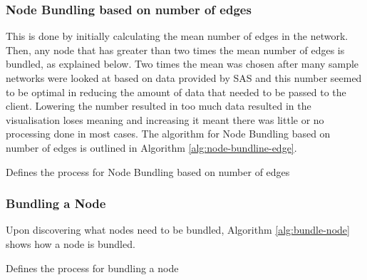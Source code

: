 \documentclass[../dissertation.tex]{subfiles}
\begin{document}
\subsubsection{Node Bundling based on number of edges}

This is done by initially calculating the mean number of edges in the network. Then, any node that has greater than two times the mean number of edges is bundled, as explained below. Two times the mean was chosen after many sample networks were looked at based on data provided by SAS and this number seemed to be optimal in reducing the amount of data that needed to be passed to the client. Lowering the number resulted in too much data resulted in the visualisation loses meaning and increasing it meant there was little or no processing done in most cases. The algorithm for Node Bundling based on number of edges is outlined in Algorithm \ref{alg:node-bundline-edge}.

\begin{algorithm}
\caption{Defines the process for Node Bundling based on number of edges}
\label{alg:node-bundline-edge}
\begin{algorithmic}
 
\ENDFOR
{}
    \ENDIF
\ENDFOR
{} 
      
\ENDFOR
\end{algorithmic}
\end{algorithm}

\subsubsection{Bundling a Node}

Upon discovering what nodes need to be bundled, Algorithm \ref{alg:bundle-node} shows how a node is bundled.

\begin{algorithm}
\caption{Defines the process for bundling a node}
\label{alg:bundle-node}
\begin{algorithmic}
 
        \ELSE
        \ENDIF
    \ENDFOR
\ENDFOR
{}
\ENDFOR
\end{algorithmic}
\end{algorithm}
\end{document}
